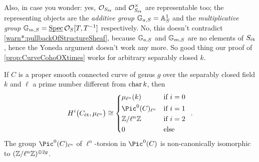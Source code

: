Also, in case you wonder: yes, $\mathcal{O}_{S_{\mathrm{\acute{e}t}}}$ and $\mathcal{O}_{S_{\mathrm{\acute{e}t}}}^\times$ are representable too; the representing objects are the \emph{additive group} $\mathbb{G}_{a,S}= \mathbb{A}_S^1$ and the \emph{multiplicative group} $\mathbb{G}_{m,S}= \operatorname{\underline{\smash{\mathrm{Spec}}}} \mathcal{O}_S[T,T^{-1}]$ respectively. No, this doesn't contradict \cref{warn*:pullbackOfStructureSheaf}, because $\mathbb{G}_{a,S}$ and $\mathbb{G}_{m,S}$ are no elements of $S_{\mathrm{\acute{e}t}}$, hence the Yoneda argument doesn't work any more. So good thing our proof of \cref{prop:CurveCohoOXtimes} works for arbitrary separably closed $k$.
\begin{cor}\label{cor:cohoOfmu}
	If $C$ is a proper smooth connected curve of genus $g$ over the separably closed field $k$ and $\ell$ a prime number different from $\operatorname{char} k$, then
	\begin{equation*}
		H^i\big(C_\et,\mu_{\ell^n}\big)\cong \begin{cases*}
			\mu_{\ell^n}(k) & if $i=0$\\
			\Pic^0(C)_{\ell^n} & if $i=1$\\
			\IZ/\ell^n\IZ & if $i=2$ \\
			0 & else
		\end{cases*}\,.
	\end{equation*}
 	The group $\Pic^0(C)_{\ell^n}$ of $\ell^n$-torsion in $\Pic^0(C)$ is non-canonically isomorphic to $(\mathbb{Z}/\ell^n\mathbb{Z})^{\oplus2g}$.
\end{cor}

